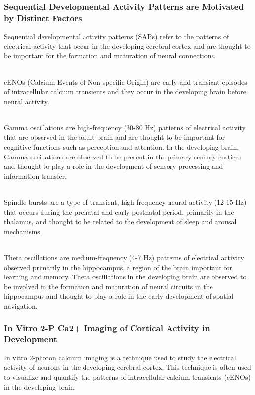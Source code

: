 \begin{itemize}
\begin{itemize}
\subsubsection{Sequential Developmental Activity Patterns are Motivated by Distinct Factors}
Sequential developmental activity patterns (SAPs) refer to the patterns of electrical activity that occur in the developing cerebral cortex and are thought to be important for the formation and maturation of neural connections.

\\cENOs (Calcium Events of Non-specific Origin) are early and transient episodes of intracellular calcium transients and they occur in the developing brain before neural activity.

\\Gamma oscillations are high-frequency (30-80 Hz) patterns of electrical activity that are observed in the adult brain and are thought to be important for cognitive functions such as perception and attention. In the developing brain, Gamma oscillations are observed to be present in the primary sensory cortices and thought to play a role in the development of sensory processing and information transfer.

\\Spindle bursts are a type of transient, high-frequency neural activity (12-15 Hz) that occurs during the prenatal and early postnatal period, primarily in the thalamus, and thought to be related to the development of sleep and arousal mechanisms.

\\Theta oscillations are medium-frequency (4-7 Hz) patterns of electrical activity observed primarily in the hippocampus, a region of the brain important for learning and memory. Theta oscillations in the developing brain are observed to be involved in the formation and maturation of neural circuits in the hippocampus and thought to play a role in the early development of spatial navigation.
\subsubsection{In Vitro 2-P Ca2+ Imaging of Cortical Activity in Development}


In vitro 2-photon calcium imaging is a technique used to study the electrical activity of neurons in the developing cerebral cortex. This technique is often used to visualize and quantify the patterns of intracellular calcium transients (cENOs) in the developing brain.


\end{itemize}
\end{itemize}
